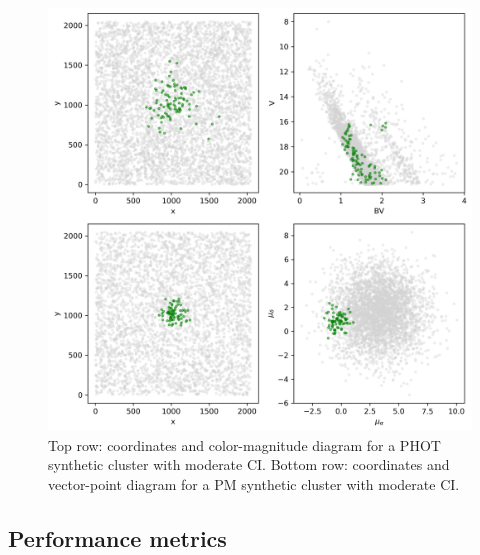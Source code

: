 \documentclass{aa}
\begin{document}
 \begin{figure}
 \includegraphics[width=\hsize]{figs/synth_clusts.png}
 \caption{Top row: coordinates and color-magnitude diagram for a PHOT synthetic
 cluster with moderate CI.
 Bottom row: coordinates and vector-point diagram for a PM synthetic
 cluster with moderate CI.}
 \label{fig:synth_clust}
 \end{figure}



\subsection{Performance metrics}
 \label{ssec:performance}


\end{document}

